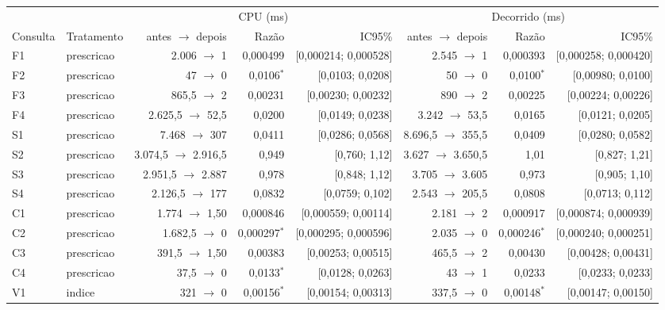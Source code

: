 {\footnotesize\setlength{\tabcolsep}{4pt}
\begin{tabular}{llrrrrrr}
\toprule
 &  & \multicolumn{3}{c}{CPU (ms)} & \multicolumn{3}{c}{Decorrido (ms)} \\
\cmidrule(lr){3-5}\cmidrule(lr){6-8}
Consulta & Tratamento & antes $\to$ depois & Razão & IC95\% & antes $\to$ depois & Razão & IC95\% \\
\midrule
F1 & prescricao & 2.006 $\to$ 1 & 0,000499 & [0,000214; 0,000528] & 2.545 $\to$ 1 & 0,000393 & [0,000258; 0,000420] \\
F2 & prescricao & 47 $\to$ 0 & 0,0106$^{*}$ & [0,0103; 0,0208] & 50 $\to$ 0 & 0,0100$^{*}$ & [0,00980; 0,0100] \\
F3 & prescricao & 865,5 $\to$ 2 & 0,00231 & [0,00230; 0,00232] & 890 $\to$ 2 & 0,00225 & [0,00224; 0,00226] \\
F4 & prescricao & 2.625,5 $\to$ 52,5 & 0,0200 & [0,0149; 0,0238] & 3.242 $\to$ 53,5 & 0,0165 & [0,0121; 0,0205] \\
S1 & prescricao & 7.468 $\to$ 307 & 0,0411 & [0,0286; 0,0568] & 8.696,5 $\to$ 355,5 & 0,0409 & [0,0280; 0,0582] \\
S2 & prescricao & 3.074,5 $\to$ 2.916,5 & 0,949 & [0,760; 1,12] & 3.627 $\to$ 3.650,5 & 1,01 & [0,827; 1,21] \\
S3 & prescricao & 2.951,5 $\to$ 2.887 & 0,978 & [0,848; 1,12] & 3.705 $\to$ 3.605 & 0,973 & [0,905; 1,10] \\
S4 & prescricao & 2.126,5 $\to$ 177 & 0,0832 & [0,0759; 0,102] & 2.543 $\to$ 205,5 & 0,0808 & [0,0713; 0,112] \\
C1 & prescricao & 1.774 $\to$ 1,50 & 0,000846 & [0,000559; 0,00114] & 2.181 $\to$ 2 & 0,000917 & [0,000874; 0,000939] \\
C2 & prescricao & 1.682,5 $\to$ 0 & 0,000297$^{*}$ & [0,000295; 0,000596] & 2.035 $\to$ 0 & 0,000246$^{*}$ & [0,000240; 0,000251] \\
C3 & prescricao & 391,5 $\to$ 1,50 & 0,00383 & [0,00253; 0,00515] & 465,5 $\to$ 2 & 0,00430 & [0,00428; 0,00431] \\
C4 & prescricao & 37,5 $\to$ 0 & 0,0133$^{*}$ & [0,0128; 0,0263] & 43 $\to$ 1 & 0,0233 & [0,0233; 0,0233] \\
V1 & indice & 321 $\to$ 0 & 0,00156$^{*}$ & [0,00154; 0,00313] & 337,5 $\to$ 0 & 0,00148$^{*}$ & [0,00147; 0,00150] \\

\end{tabular}}
